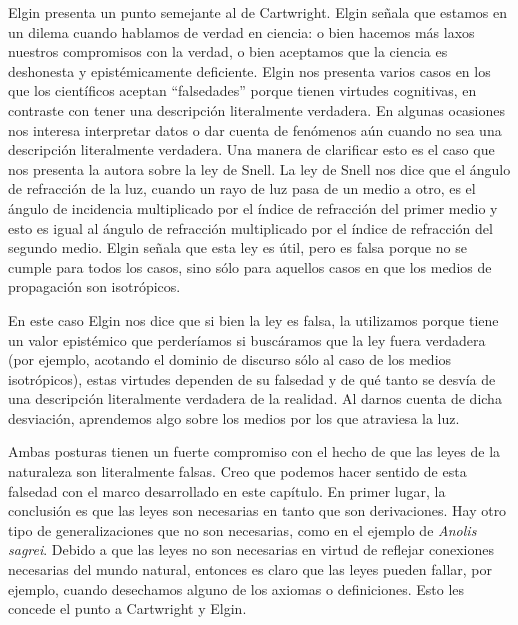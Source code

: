 Elgin presenta un punto semejante al de Cartwright. Elgin \citeyear{Elgin2004} señala que estamos en un dilema cuando hablamos de verdad en ciencia: o bien hacemos más laxos nuestros compromisos con la verdad, o bien aceptamos que la ciencia es deshonesta y epistémicamente deficiente. Elgin nos presenta varios casos en los que los científicos aceptan ``falsedades'' porque tienen virtudes cognitivas, en contraste con tener una descripción literalmente verdadera. En algunas ocasiones nos interesa interpretar datos o dar cuenta de fenómenos aún cuando no sea una descripción literalmente verdadera. Una manera de clarificar esto es el caso que nos presenta la autora sobre la ley de Snell. La ley de Snell nos dice que el ángulo de refracción de la luz, cuando un rayo de luz pasa de un medio a otro, es el ángulo de incidencia multiplicado por el índice de refracción del primer medio y esto es igual al ángulo de refracción multiplicado por el índice de refracción del segundo medio. Elgin señala que esta ley es útil, pero es falsa porque no se cumple para todos los casos, sino sólo para aquellos casos en que los medios de propagación son isotrópicos.

En este caso Elgin nos dice que si bien la ley es falsa, la utilizamos porque tiene un valor epistémico que perderíamos si buscáramos que la ley fuera verdadera (por ejemplo, acotando el dominio de discurso sólo al caso de los medios isotrópicos), estas virtudes dependen de su falsedad y de qué tanto se desvía de una descripción literalmente verdadera de la realidad. Al darnos cuenta de dicha desviación, aprendemos algo sobre los medios por los que atraviesa la luz.

Ambas posturas tienen un fuerte compromiso con el hecho de que las leyes de la naturaleza son literalmente falsas. Creo que podemos hacer sentido de esta falsedad con el marco desarrollado en este capítulo. En primer lugar, la conclusión es que las leyes son necesarias en tanto que son derivaciones. Hay otro tipo de generalizaciones que no son necesarias, como en el ejemplo de \emph{Anolis sagrei}. Debido a que las leyes no son necesarias en virtud de reflejar conexiones necesarias del mundo natural, entonces es claro que las leyes pueden fallar, por ejemplo, cuando desechamos alguno de los axiomas o definiciones. Esto les concede el punto a Cartwright y Elgin.

